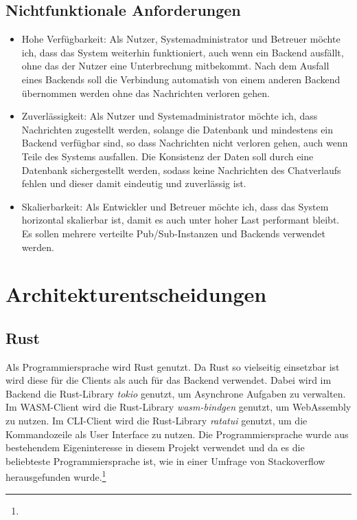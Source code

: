 \subsection{Nichtfunktionale Anforderungen}
\begin{itemize}
  \item Hohe Verfügbarkeit: Als Nutzer, Systemadministrator und Betreuer möchte ich, dass das System weiterhin funktioniert, auch wenn ein Backend ausfällt, ohne das der Nutzer eine Unterbrechung mitbekommt. Nach dem Ausfall eines Backends soll die Verbindung automatish von einem anderen Backend übernommen werden ohne das Nachrichten verloren gehen.
  \item Zuverlässigkeit: Als Nutzer und Systemadministrator möchte ich, dass Nachrichten zugestellt werden, solange die Datenbank und mindestens ein Backend verfügbar sind, so dass Nachrichten nicht verloren gehen, auch wenn Teile des Systems ausfallen. Die Konsistenz der Daten soll durch eine Datenbank sichergestellt werden, sodass keine Nachrichten des Chatverlaufs fehlen und dieser damit eindeutig und zuverlässig ist.
  \item Skalierbarkeit: Als Entwickler und Betreuer möchte ich, dass das System horizontal skalierbar ist, damit es auch unter hoher Last performant bleibt. Es sollen mehrere verteilte Pub/Sub-Instanzen und Backends verwendet werden.
\end{itemize}

\section{Architekturentscheidungen}

\subsection{Rust}
Als Programmiersprache wird Rust genutzt.
Da Rust so vielseitig einsetzbar ist wird diese für die Clients als auch für das Backend verwendet.
Dabei wird im Backend die Rust-Library \textit{tokio} genutzt, um Asynchrone Aufgaben zu verwalten.
Im \ac{WASM}-Client wird die Rust-Library \textit{wasm-bindgen} genutzt, um WebAssembly zu nutzen.
Im \ac{CLI}-Client wird die Rust-Library \textit{ratatui} genutzt, um die Kommandozeile als User Interface zu nutzen.
Die Programmiersprache wurde aus bestehendem Eigeninteresse in diesem Projekt verwendet und da es die beliebteste Programmiersprache ist, wie in einer Umfrage von Stackoverflow herausgefunden wurde.\footnote{}


